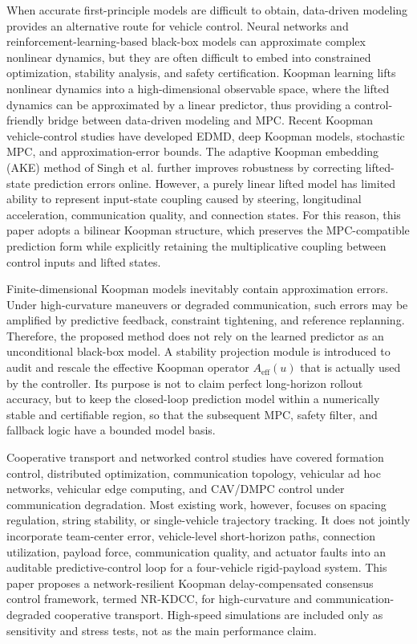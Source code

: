 \documentclass[twocolumn,3p,times,procedia]{elsarticle}
\newcommand{\Method}{NR-KDCC}
\begin{document}
When accurate first-principle models are difficult to obtain, data-driven modeling provides an alternative route for vehicle control. Neural networks and reinforcement-learning-based black-box models can approximate complex nonlinear dynamics, but they are often difficult to embed into constrained optimization, stability analysis, and safety certification. Koopman learning lifts nonlinear dynamics into a high-dimensional observable space, where the lifted dynamics can be approximated by a linear predictor, thus providing a control-friendly bridge between data-driven modeling and MPC\cite{brunton2016koopmanControl,korda2018koopmanMpc}. Recent Koopman vehicle-control studies have developed EDMD, deep Koopman models, stochastic MPC, and approximation-error bounds\cite{kim2025ksmpc,chen2024esoDeepKoopman,philipp2023koopmanErrorBounds,cibulka2021koopmanVehicleMpc}. The adaptive Koopman embedding (AKE) method of Singh et al. further improves robustness by correcting lifted-state prediction errors online\cite{singh2025adaptiveKoopman}. However, a purely linear lifted model has limited ability to represent input-state coupling caused by steering, longitudinal acceleration, communication quality, and connection states. For this reason, this paper adopts a bilinear Koopman structure, which preserves the MPC-compatible prediction form while explicitly retaining the multiplicative coupling between control inputs and lifted states.

Finite-dimensional Koopman models inevitably contain approximation errors. Under high-curvature maneuvers or degraded communication, such errors may be amplified by predictive feedback, constraint tightening, and reference replanning. Therefore, the proposed method does not rely on the learned predictor as an unconditional black-box model. A stability projection module is introduced to audit and rescale the effective Koopman operator $A_{\mathrm{eff}}(u)$ that is actually used by the controller. Its purpose is not to claim perfect long-horizon rollout accuracy, but to keep the closed-loop prediction model within a numerically stable and certifiable region, so that the subsequent MPC, safety filter, and fallback logic have a bounded model basis.

Cooperative transport and networked control studies have covered formation control, distributed optimization, communication topology, vehicular ad hoc networks, vehicular edge computing, and CAV/DMPC control under communication degradation\cite{an2023multiRobotCommTransport,tan2022mlVehicularDcn,zhao2025blockchainVanetDcn,wu2025drlVecDcn,bian2025markovPacketLossDMPC,dosDMPC2024isa,robustCommunicationLoss2025trb}. Most existing work, however, focuses on spacing regulation, string stability, or single-vehicle trajectory tracking. It does not jointly incorporate team-center error, vehicle-level short-horizon paths, connection utilization, payload force, communication quality, and actuator faults into an auditable predictive-control loop for a four-vehicle rigid-payload system. This paper proposes a network-resilient Koopman delay-compensated consensus control framework, termed \Method{}, for high-curvature and communication-degraded cooperative transport. High-speed simulations are included only as sensitivity and stress tests, not as the main performance claim.
\end{document}
